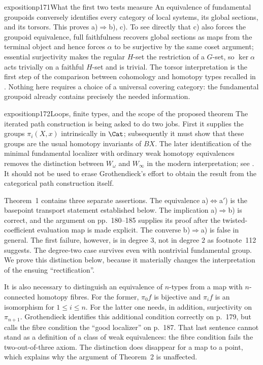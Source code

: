 \begin{dcomment}{exposition}{p171}{What the first two tests measure}
An equivalence of fundamental groupoids conversely identifies every category of local systems, its global sections, and its torsors. This proves a)$\Rightarrow$b), c). To see directly that c) also forces the groupoid equivalence, full faithfulness recovers global sections as maps from the terminal object and hence forces $\alpha$ to be surjective by the same coset argument; essential surjectivity makes the regular $H$-set the restriction of a $G$-set, so $\ker\alpha$ acts trivially on a faithful $H$-set and is trivial. The torsor interpretation is the first step of the comparison between cohomology and homotopy types recalled in \citet[Preface, pp.~vii--viii]{Lurie2009HTT}. Nothing here requires a choice of a universal covering category: the fundamental groupoid already contains precisely the needed information.
\end{dcomment}

\begin{dcomment}{exposition}{p172}{Loops, finite types, and the scope of the proposed theorem}
The iterated path construction is being asked to do two jobs. First it supplies the groups $\pi_i(X,x)$ intrinsically in $\Cat$; subsequently it must show that these groups are the usual homotopy invariants of $BX$. The later identification of the minimal fundamental localizer with ordinary weak homotopy equivalences removes the distinction between $W_\omega$ and $W_\infty$ in the modern interpretation; see \citet[Theorem~2.2.11]{Cisinski2004Minimal}. It should not be used to erase Grothendieck's effort to obtain the result from the categorical path construction itself.

Theorem~1 contains three separate assertions. The equivalence a)$\Leftrightarrow$a$'$) is the basepoint transport statement established below. The implication a)$\Rightarrow$b) is correct, and the argument on pp.~180--185 supplies its proof after the twisted-coefficient evaluation map is made explicit. The converse b)$\Rightarrow$a) is false in general. The first failure, however, is in degree $3$, not in degree $2$ as footnote~112 suggests. The degree-two case survives even with nontrivial fundamental group. We prove this distinction below, because it materially changes the interpretation of the ensuing ``rectification''.

It is also necessary to distinguish an equivalence of $n$-types from a map with $n$-connected homotopy fibres. For the former, $\pi_0f$ is bijective and $\pi_if$ is an isomorphism for $1\leq i\leq n$. For the latter one needs, in addition, surjectivity on $\pi_{n+1}$. Grothendieck identifies this additional condition correctly on p.~179, but calls the fibre condition the ``good localizer'' on p.~187. That last sentence cannot stand as a definition of a class of weak equivalences: the fibre condition fails the two-out-of-three axiom. The distinction does disappear for a map to a point, which explains why the argument of Theorem~2 is unaffected.
\end{dcomment}

